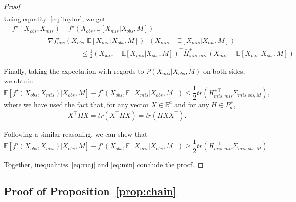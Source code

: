\documentclass{article}
\newcommand{\RR}{\mathbb{R}}
\newcommand{\E}{\mathbb{E}}
\newcommand{\br}[1]{\left(#1\right)}
\newcommand{\sqb}[1]{\left[#1\right]}
\theoremstyle{plain}
\begin{document}
\begin{proof}
\begin{align*}
    \end{align*}
    Using equality~\eqref{eq:Taylor}, we get:
    \begin{align*}
        & f^\star(X_{obs}, X_{mis})  - f^\star(X_{obs}, \E\sqb{X_{mis}|X_{obs}, M})\\
        & \hspace{4em} - \nabla f^\star_{mis}(X_{obs}, \E\sqb{X_{mis}|X_{obs}, M})^\top \br{X_{mis} - \E\sqb{X_{mis}|X_{obs}, M}} \\ 
        & \hspace{10em} \leq \frac{1}{2}\br{X_{mis} - \E\sqb{X_{mis}|X_{obs}, M}}^\top \bar H^+_{mis, mis} \br{X_{mis} - \E\sqb{X_{mis}|X_{obs}, M}}
    \end{align*}
    
    Finally, taking the expectation with regards to $P(X_{mis}|X_{obs}, M)$ on both sides, we obtain
    \begin{equation}
    \label{eq:maj}
        \E\sqb{f^\star(X_{obs}, X_{mis})|X_{obs}, M} - f^\star(X_{obs}, \E\sqb{X_{mis}|X_{obs}, M}) \leq \frac{1}{2} tr(H_{mis, mis}^{+ \top} \Sigma_{mis|obs, M}),
    \end{equation}
    where we have used the fact that, for any vector $X \in \RR^d$ and for any $H \in P_d^+$,
    \begin{align*}
     X^\top H X = tr(X^\top H X) = tr( H X X^\top).
    \end{align*}
    
    Following a similar reasoning, we can show that:
    \begin{equation}
    \label{eq:min}
        \E\sqb{f^\star(X_{obs}, X_{mis})|X_{obs}, M} - f^\star(X_{obs}, \E\sqb{X_{mis}|X_{obs}, M}) \geq \frac{1}{2} tr(H_{mis, mis}^{- \top} \Sigma_{mis|obs, M})
    \end{equation}
    
    Together, inequalities~\eqref{eq:maj} and \eqref{eq:min} conclude the proof.
\end{proof}


\subsection{Proof of Proposition~\ref{prop:chain}}
\label{ss:proof_prop_chain}

\propchain*
\end{document}

